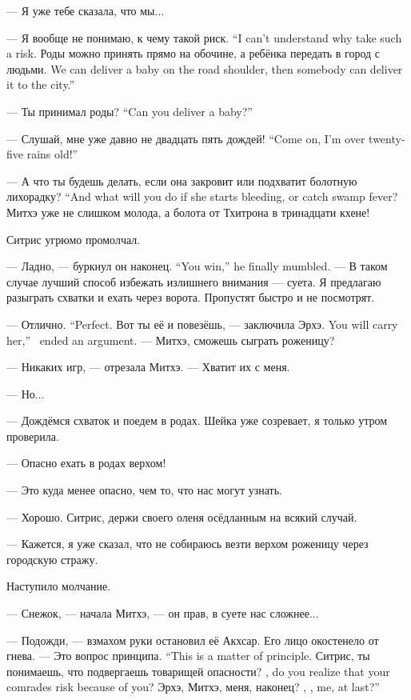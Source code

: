 --- Я уже тебе сказала, что мы...

{--- Я вообще не понимаю, к чему такой риск.}
{``I can't understand why take such a risk.}
{Роды можно принять прямо на обочине, а ребёнка передать в город с людьми.}
{We can deliver a baby on the road shoulder, then somebody can deliver it to the city.''}

{--- Ты принимал роды?}
{``Can you deliver a baby?''}

{--- Слушай, мне уже давно не двадцать пять дождей!}
{``Come on, I'm over twenty-five rains old!''}

{--- А что ты будешь делать, если она закровит или подхватит болотную лихорадку?}
{``And what will you do if she starts bleeding, or catch swamp fever?}
Митхэ уже не слишком молода, а болота от Тхитрона в тринадцати кхене!

Ситрис угрюмо промолчал.

{--- Ладно, --- буркнул он наконец.}
{``You win,'' he finally mumbled.}
--- В таком случае лучший способ избежать излишнего внимания --- суета.
Я предлагаю разыграть схватки и ехать через ворота.
Пропустят быстро и не посмотрят.

{--- Отлично.}
{``Perfect.}
{Вот ты её и повезёшь, --- заключила Эрхэ.}
{You will carry her,'' \Oerchoe\ ended an argument.}
--- Митхэ, сможешь сыграть роженицу?

--- Никаких игр, --- отрезала Митхэ.
--- Хватит их с меня.

--- Но...

--- Дождёмся схваток и поедем в родах.
Шейка уже созревает, я только утром проверила.

--- Опасно ехать в родах верхом!

--- Это куда менее опасно, чем то, что нас могут узнать.

--- Хорошо.
Ситрис, держи своего оленя осёдланным на всякий случай.

--- Кажется, я уже сказал, что не собираюсь везти верхом роженицу через городскую стражу.

Наступило молчание.

--- Снежок, --- начала Митхэ, --- он прав, в суете нас сложнее...

--- Подожди, --- взмахом руки остановил её Акхсар.
Его лицо окостенело от гнева.
{--- Это вопрос принципа.}
{``This is a matter of principle.}
{Ситрис, ты понимаешь, что подвергаешь товарищей опасности?}
{\Sitris, do you realize that your comrades risk because of you?}
{Эрхэ, Митхэ, меня, наконец?}
{\Oerchoe, \Mitchoe, me, at last?''}

